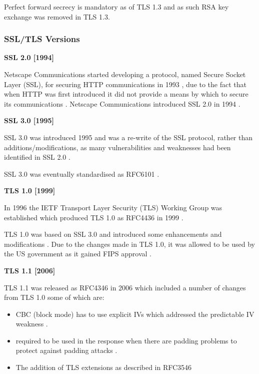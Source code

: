 \documentclass{mscreport}
\begin{document}
\vspace{0.3cm} \noindent
Perfect forward secrecy is mandatory as of TLS 1.3 and as such RSA key exchange was removed in TLS 1.3.

\subsubsection{SSL/TLS Versions}
\textbf{SSL 2.0 [1994]}

\noindent
Netscape Communications started developing a protocol, named Secure Socket Layer (SSL), for securing HTTP communications in 1993 \cite{Oppliger2016-ig}, due to the fact that when HTTP was first introduced it did not provide a means by which to secure its communications \cite{Oppliger2016-ig}.
Netscape Communications introduced SSL 2.0 in 1994 \cite{Oppliger2016-ig,Wu2016-nx}.

\vspace{0.7cm} \noindent
\textbf{SSL 3.0 [1995]}

\noindent
SSL 3.0 was introduced 1995 \cite{Ristic2017-aj,Oppliger2016-ig} and was a re-write of the SSL protocol, rather than additions/modifications, as many vulnerabilities and weaknesses had been identified in SSL 2.0 \cite{Ristic2017-aj,Wagner1996-fx}.

\vspace{0.3cm}\noindent
SSL 3.0 was eventually standardised as RFC6101 \cite{Freier2011-pt}.

\vspace{0.7cm} \noindent
\textbf{TLS 1.0 [1999]}

\noindent
In 1996 the IETF Transport Layer Security (TLS) Working Group was established \cite{Oppliger2016-ig,Farrell2010-kv} which produced TLS 1.0 as RFC4436 in 1999 \cite{Dierks1999-fn}.

\vspace{0.3cm} \noindent
TLS 1.0 was based on SSL 3.0 and introduced some enhancements and modifications \cite{Rescorla2001-gg}. Due to the changes made in TLS 1.0, it was allowed to be used by the US government as it gained FIPS approval \cite{Ristic2017-aj}.

\vspace{0.7cm} \noindent
\textbf{TLS 1.1 [2006]}

\noindent
TLS 1.1 was released as RFC4346 in 2006 \cite{Dierks2006-wu} which included a number of changes from TLS 1.0 some of which are:
\begin{itemize}
  \setlength\itemsep{0.1em}
  \item CBC (block mode) has to use explicit IVs which addressed the predictable IV weakness \cite{Ristic2017-aj}.
  \item \texttt{} required to be used in the response when there are padding problems to protect against padding attacks \cite{Ristic2017-aj}.
  \item The addition of TLS extensions \cite{Ristic2017-aj} as described in RFC3546 \cite{Blake-Wilson2003-qv}
\end{itemize}
\end{document}
